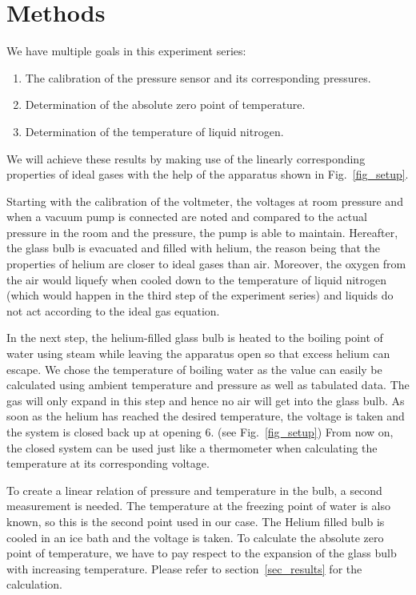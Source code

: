 \section{Methods}


    We have multiple goals in this experiment series:
    \begin{enumerate}
        \item The calibration of the pressure sensor and its corresponding pressures.
        \item Determination of the absolute zero point of temperature.
        \item Determination of the temperature of liquid nitrogen.
    \end{enumerate}
    We will achieve these results by making use of the linearly corresponding properties of ideal gases with the help of the apparatus shown in Fig.~\ref{fig_setup}.

    

    Starting with the calibration of the voltmeter, the voltages at room pressure and when a vacuum pump is connected are noted and compared to the actual pressure in the room and the pressure, the pump is able to maintain.
    Hereafter, the glass bulb is evacuated and filled with helium, the reason being that the properties of helium are closer to ideal gases than air.
    Moreover, the oxygen from the air would liquefy when cooled down to the temperature of liquid nitrogen (which would happen in the third step of the experiment series) and liquids do not act according to the ideal gas equation.

    In the next step, the helium-filled glass bulb is heated to the boiling point of water using steam while leaving the apparatus open so that excess helium can escape.
    We chose the temperature of boiling water as the value can easily be calculated using ambient temperature and pressure as well as tabulated data.
    The gas will only expand in this step and hence no air will get into the glass bulb.
    As soon as the helium has reached the desired temperature, the voltage is taken and the system is closed back up at opening 6. (see Fig.~\ref{fig_setup})
    From now on, the closed system can be used just like a thermometer when calculating the temperature at its corresponding voltage.
    
    To create a linear relation of pressure and temperature in the bulb, a second measurement is needed.
    The temperature at the freezing point of water is also known, so this is the second point used in our case.
    The Helium filled bulb is cooled in an ice bath and the voltage is taken.
    To calculate the absolute zero point of temperature, we have to pay respect to the expansion of the glass bulb with increasing temperature.
    Please refer to section~\ref{sec_results} for the calculation.

